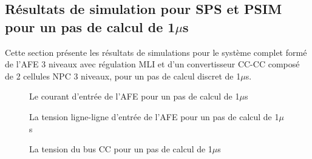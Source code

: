 \subsection{Résultats de simulation pour SPS et PSIM pour un pas de calcul de 1$\mu$s}
Cette section présente les résultats de simulations pour le système complet formé de l'AFE 3 niveaux avec régulation MLI et d'un convertisseur CC-CC composé de 2 cellules NPC 3 niveaux, pour un pas de calcul discret de 1$\mu$s. 

\begin{figure}[htb]
\caption{Le courant d'entrée de l'AFE pour un pas de calcul de 1$\mu$s}
\label{AF_DC_cou1}
\end{figure}


\begin{figure}[htb]
\caption{La tension ligne-ligne d'entrée de l'AFE pour un pas de calcul de 1$\mu$s}
\label{AF_DC_ten1}
\end{figure}


\begin{figure}[htb]
\caption{La tension du bus CC pour un pas de calcul de 1$\mu$s}
\label{AF_DC_vch1}
\end{figure}



